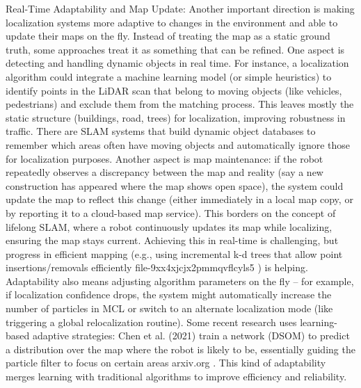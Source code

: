     Real-Time Adaptability and Map Update: Another important direction is making localization systems more adaptive to changes in the environment and able to update their maps on the fly. Instead of treating the map as a static ground truth, some approaches treat it as something that can be refined. One aspect is detecting and handling dynamic objects in real time. For instance, a localization algorithm could integrate a machine learning model (or simple heuristics) to identify points in the LiDAR scan that belong to moving objects (like vehicles, pedestrians) and exclude them from the matching process. This leaves mostly the static structure (buildings, road, trees) for localization, improving robustness in traffic. There are SLAM systems that build dynamic object databases to remember which areas often have moving objects and automatically ignore those for localization purposes. Another aspect is map maintenance: if the robot repeatedly observes a discrepancy between the map and reality (say a new construction has appeared where the map shows open space), the system could update the map to reflect this change (either immediately in a local map copy, or by reporting it to a cloud-based map service). This borders on the concept of lifelong SLAM, where a robot continuously updates its map while localizing, ensuring the map stays current. Achieving this in real-time is challenging, but progress in efficient mapping (e.g., using incremental k-d trees that allow point insertions/removals efficiently​
    file-9xx4xjcjx2pmmqvflcyls5
    ) is helping. Adaptability also means adjusting algorithm parameters on the fly – for example, if localization confidence drops, the system might automatically increase the number of particles in MCL or switch to an alternate localization mode (like triggering a global relocalization routine). Some recent research uses learning-based adaptive strategies: Chen et al. (2021) train a network (DSOM) to predict a distribution over the map where the robot is likely to be, essentially guiding the particle filter to focus on certain areas​
    arxiv.org
    . This kind of adaptability merges learning with traditional algorithms to improve efficiency and reliability.


